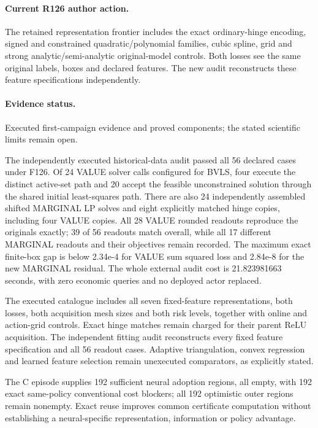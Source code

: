 \paragraph{Current R126 author action.} The retained representation frontier includes the exact ordinary-hinge encoding, signed and constrained quadratic/polynomial families, cubic spline, grid and strong analytic/semi-analytic original-model controls. Both losses see the same original labels, boxes and declared features. The new audit reconstructs these feature specifications independently.

\paragraph{Evidence status.} Executed first-campaign evidence and proved components; the stated scientific limits remain open.

The independently executed historical-data audit passed all 56 declared cases under F126. Of 24 VALUE solver calls configured for BVLS, four execute the distinct active-set path and 20 accept the feasible unconstrained solution through the shared initial least-squares path. There are also 24 independently assembled shifted MARGINAL LP solves and eight explicitly matched hinge copies, including four VALUE copies. All 28 VALUE rounded readouts reproduce the originals exactly; 39 of 56 readouts match overall, while all 17 different MARGINAL readouts and their objectives remain recorded. The maximum exact finite-box gap is below 2.34e-4 for VALUE sum squared loss and 2.84e-8 for the new MARGINAL residual. The whole external audit cost is 21.823981663 seconds, with zero economic queries and no deployed actor replaced.\par
The executed catalogue includes all seven fixed-feature representations, both losses, both acquisition mesh sizes and both risk levels, together with online and action-grid controls. Exact hinge matches remain charged for their parent ReLU acquisition. The independent fitting audit reconstructs every fixed feature specification and all 56 readout cases. Adaptive triangulation, convex regression and learned feature selection remain unexecuted comparators, as explicitly stated.\par
The C episode supplies 192 sufficient neural adoption regions, all empty, with 192 exact same-policy conventional cost blockers; all 192 optimistic outer regions remain nonempty. Exact reuse improves common certificate computation without establishing a neural-specific representation, information or policy advantage.\par

